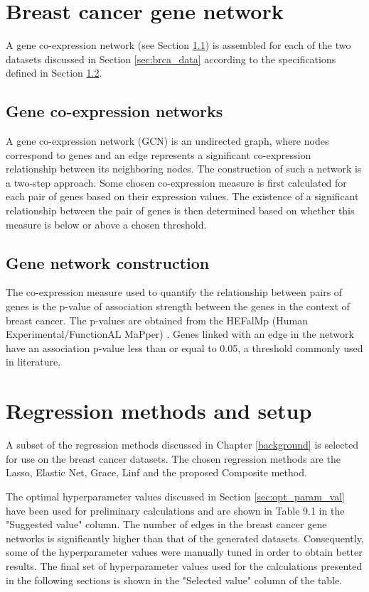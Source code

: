 \section{Breast cancer gene network} \label{sec:brca_net}
A gene co-expression network (see Section \ref{sec:gcn}) is assembled for each of the two datasets discussed in Section \ref{sec:brca_data} according to the specifications defined in Section \ref{sec:gcn_imp}. 

\subsection{Gene co-expression networks} \label{sec:gcn}
A gene co-expression network (GCN) is an undirected graph, where nodes correspond to genes and an edge represents a significant co-expression relationship between its neighboring nodes. The construction of such a network is a two-step approach. Some chosen co-expression measure is first calculated for each pair of genes based on their expression values. The existence of a significant relationship between the pair of genes is then determined based on whether this measure is below or above a chosen threshold. 

\subsection{Gene network construction} \label{sec:gcn_imp}
The co-expression measure used to quantify the relationship between pairs of genes is the p-value of association strength between the genes in the context of breast cancer. The p-values are obtained from the HEFalMp (Human Experimental/FunctionAL MaPper) \cite{huttenhower2009exploring}. Genes linked with an edge in the network have an association p-value less than or equal to 0.05, a threshold commonly used in literature.


\section{Regression methods and setup}
A subset of the regression methods discussed in Chapter \ref{background} is selected for use on the breast cancer datasets. The chosen regression methods are the Lasso, Elastic Net, Grace, Linf and the proposed Composite method.

The optimal hyperparameter values discussed in Section \ref{sec:opt_param_val} have been used for preliminary calculations and are shown in Table 
9.1 %
in the "Suggested value" column. The number of edges in the breast cancer gene networks is significantly higher than that of the generated datasets. Consequently, some of the hyperparameter values were manually tuned in order to obtain better results. The final set of hyperparameter values used for the calculations presented in the following sections is shown in the "Selected value" column of the table.

